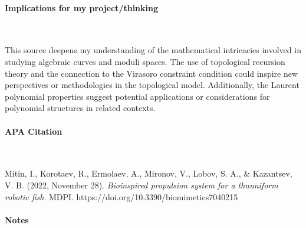 \vspace*{-0.5cm}
\paragraph{Implications for my project/thinking} \

This source deepens my understanding of the mathematical intricacies involved in studying algebraic curves and moduli spaces. The use of topological recursion theory and the connection to the Virasoro constraint condition could inspire new perspectives or methodologies in the topological model. Additionally, the Laurent polynomial properties suggest potential applications or considerations for polynomial structures in related contexts.

\newpage 

\vspace*{-0.5cm}
\paragraph{APA Citation} \

\begin{hangparas}{.25in}{1}
Mitin, I., Korotaev, R., Ermolaev, A., Mironov, V., Lobov, S. A., \& Kazantsev, V. B. (2022, November 28). \textit{Bioinspired propulsion system for a thunniform robotic fish}. MDPI. https://doi.org/10.3390/biomimetics7040215
\end{hangparas}

\vspace*{-0.5cm}
\paragraph{Notes} \

